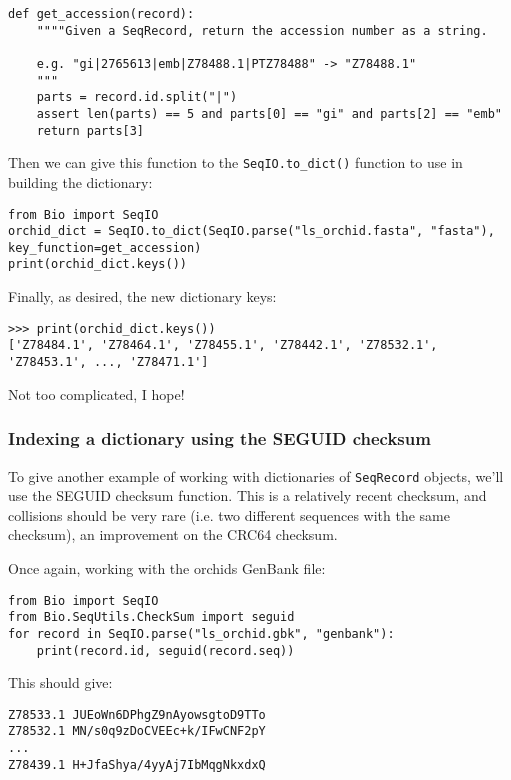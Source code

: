 \begin{verbatim}
def get_accession(record):
    """"Given a SeqRecord, return the accession number as a string.

    e.g. "gi|2765613|emb|Z78488.1|PTZ78488" -> "Z78488.1"
    """
    parts = record.id.split("|")
    assert len(parts) == 5 and parts[0] == "gi" and parts[2] == "emb"
    return parts[3]
\end{verbatim}

\noindent Then we can give this function to the \verb|SeqIO.to_dict()| function to use in building the dictionary:

\begin{verbatim}
from Bio import SeqIO
orchid_dict = SeqIO.to_dict(SeqIO.parse("ls_orchid.fasta", "fasta"), key_function=get_accession)
print(orchid_dict.keys())
\end{verbatim}

\noindent Finally, as desired, the new dictionary keys:

\begin{verbatim}
>>> print(orchid_dict.keys())
['Z78484.1', 'Z78464.1', 'Z78455.1', 'Z78442.1', 'Z78532.1', 'Z78453.1', ..., 'Z78471.1']
\end{verbatim}

\noindent Not too complicated, I hope!

\subsubsection{Indexing a dictionary using the SEGUID checksum}

To give another example of working with dictionaries of \verb|SeqRecord| objects, we'll use the SEGUID checksum function.  This is a relatively recent checksum, and collisions should be very rare (i.e. two different sequences with the same checksum), an improvement on the CRC64 checksum.

Once again, working with the orchids GenBank file:

\begin{verbatim}
from Bio import SeqIO
from Bio.SeqUtils.CheckSum import seguid
for record in SeqIO.parse("ls_orchid.gbk", "genbank"):
    print(record.id, seguid(record.seq))
\end{verbatim}

\noindent This should give:

\begin{verbatim}
Z78533.1 JUEoWn6DPhgZ9nAyowsgtoD9TTo
Z78532.1 MN/s0q9zDoCVEEc+k/IFwCNF2pY
...
Z78439.1 H+JfaShya/4yyAj7IbMqgNkxdxQ
\end{verbatim}

